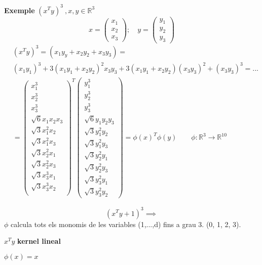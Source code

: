 \documentclass[a4paper]{article}
\begin{document}
\textbf{Exemple} $(x^Ty)^3 \ ,x,y \in \mathbb{R}^3$
$$
x = \begin{pmatrix}
x_1 \\
x_2 \\
x_3
\end{pmatrix};
\quad 
y = \begin{pmatrix}
y_1 \\
y_2 \\
y_3
\end{pmatrix}
$$
\begin{align*}
	& (x^Ty)^3 = (x_1y_y + x_2y_2 + x_3y_3) = \\
	& (x_1y_1)^3 + 3(x_1y_1 + x_2y_2)^2 x_3y_3 + 3(x_1y_1 +
	 x_2y_2)(x_3y_3)^2 + (x_3y_3)^3 = ... \\
	& = 
	\begin{pmatrix}
	x_1^3 \\
	x_2^3 \\
	x_3^3 \\
	\sqrt{6} x_1x_2x_3 \\
	\sqrt{3} x_1^2x_2 \\
	\sqrt{3} x_1^2x_3 \\
	\sqrt{3} x_2^2x_1 \\
	\sqrt{3} x_2^2x_3 \\
	\sqrt{3} x_3^3x_1 \\
	\sqrt{3} x_3^3x_2 \\
	\end{pmatrix}^T 
	\begin{pmatrix}
	y_1^3 \\
	y_2^3 \\
	y_3^3 \\
	\sqrt{6} y_1y_2y_3 \\
	\sqrt{3} y_1^2y_2 \\
	\sqrt{3} y_1^2y_3 \\
	\sqrt{3} y_2^2y_1 \\
	\sqrt{3} y_2^2y_3 \\
	\sqrt{3} y_3^2y_1 \\
	\sqrt{3} y_3^2y_2
	\end{pmatrix}
	= \phi(x)^T\phi(y) \qquad \phi:\mathbb{R}^3 \rightarrow \mathbb{R}^{10}
\end{align*}


$$
(x^Ty + 1)^3 \implies
$$
$\phi$ calcula tots els monomis de les variables (1,...,d) fins a grau 3. (0, 1, 2, 3).

$x^Ty$ \textbf{kernel lineal}

$\phi(x) = x$
\end{document}
